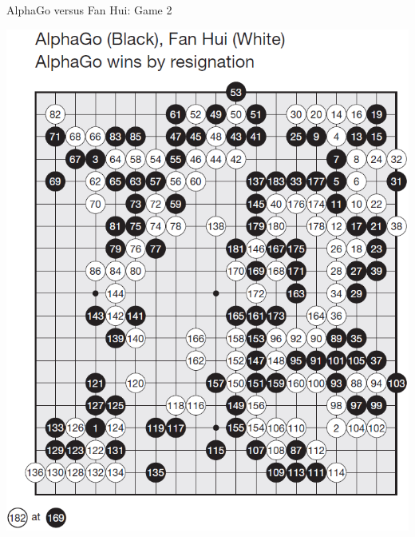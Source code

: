 \documentclass{beamer}
\begin{document}
{    \begin{frame}{AlphaGo versus Fan Hui: Game 2}
      \begin{center}
        \includegraphics[height=.9\textheight]{../img/AlphaGo_vs_Fan_Hui_Game_2.png}
      \end{center}
    \end{frame}

}
\end{document}

